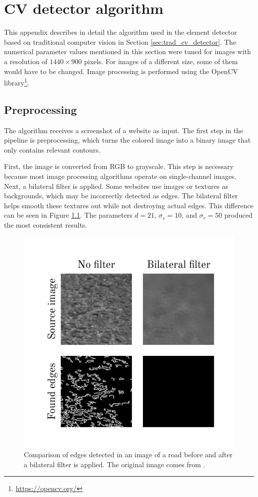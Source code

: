 \documentclass[
  digital,     %
  oneside,     %
  nosansbold,  %
  nocolorbold, %
  lof,         %
  lot,         %
]{fithesis4}
\begin{document}
\chapter{CV detector algorithm}
\label{ap:cv}

This appendix describes in detail the algorithm used in the element detector based on traditional computer vision in Section \ref{sec:trad_cv_detector}. The numerical parameter values mentioned in this section were tuned for images with a resolution of $1440\times900$ pixels. For images of a different size, some of them would have to be changed. Image processing is performed using the OpenCV library\footnote{\url{https://opencv.org/}}.

\section{Preprocessing}

The algorithm receives a screenshot of a website as input. The first step in the pipeline is preprocessing, which turns the colored image into a binary image that only contains relevant contours.

First, the image is converted from RGB to grayscale. This step is necessary because most image processing algorithms operate on single-channel images. Next, a bilateral filter is applied. Some websites use images or textures as backgrounds, which may be incorrectly detected as edges. The bilateral filter helps smooth these textures out while not destroying actual edges. This difference can be seen in Figure \ref{fig:bilateral}. The parameters $d=21$, $\sigma_s =10$, and $\sigma_r = 50$ produced the most consistent results.

\begin{figure}
    \centering
    \includegraphics[width=1\linewidth]{diagrams/bilateral.pdf}
    \caption{Comparison of edges detected in an image of a road before and after a bilateral filter is applied. The original image comes from \cite{aydos2020}.}
    \label{fig:bilateral}
\end{figure}
\end{document}
